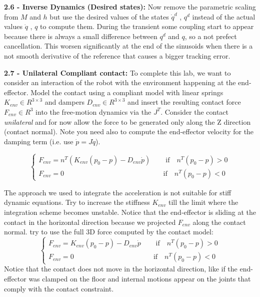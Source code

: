 \documentclass[11pt]{article}
\begin{document}
\quad

\noindent
\textbf{ 2.6 - Inverse Dynamics (Desired states):}
Now remove  the parametric scaling from  $M$ and $h$  but use the desired values of the states $\dot{q}^d$ , $q^d$  instead of 
the actual values $\dot{q}$ , $q$ to compute them. During the transient some coupling start to appear because there is always a small difference between $q^d$ and $q$, so a not prefect cancellation. This worsen significantly at the end of the sinusoids when there is a not smooth derivative of the reference that causes a bigger tracking error.
 
\quad

\noindent 
\textbf{ 2.7 - Unilateral Compliant contact:} 
To complete this lab, we want to consider an interaction of the robot with the environment happening at the end-effector. 
Model the contact using a compliant model with linear  springs $K_{env}\in R^{3 \times 3}$ and dampers $D_{env}\in R^{3 \times 3}$  and insert the resulting contact force $F_{env} \in R^3$ into the free-motion dynamics via the $J^T$. Consider the contact \textit{unilateral} and for now allow the force to be generated only along the Z direction (contact normal).
Note you need also to compute the end-effector velocity for the damping term (i.e. use $\dot{p} = J\dot{q}$).

\begin{equation*}
\begin{cases}
	F_{env} = n^T (K_{env}(p_0 - p) - D_{env} \dot{p}) \quad &\text{   if}\quad n^T(p_0 -p ) >0 \\ 
	F_{env} = 0     \quad &\text{if}\quad n^T(p_0 -p ) <0
	\end{cases}
\end{equation*}

The approach we used to integrate the acceleration is not suitable for stiff dynamic equations. Try to increase the stiffness $K_{env}$ till the limit where the integration scheme becomes unstable.
Notice that the end-effector is  sliding at the contact in the horizontal direction because we projected $F_{env}$ along the contact normal.
try to use the full 3D force computed by the contact model:
\begin{equation*}
\begin{cases}
F_{env} = K_{env}(p_0 - p) - D_{env} \dot{p} \quad &\text{   if}\quad n^T(p_0 -p ) >0 \\ 
F_{env} = 0     \quad &\text{if}\quad n^T(p_0 -p ) <0
\end{cases}
\end{equation*}
%
Notice that the contact does not move in the horizontal direction, like if the end-effector was clamped on the floor and internal motions appear on the joints that comply with the contact constraint. 
\end{document}
